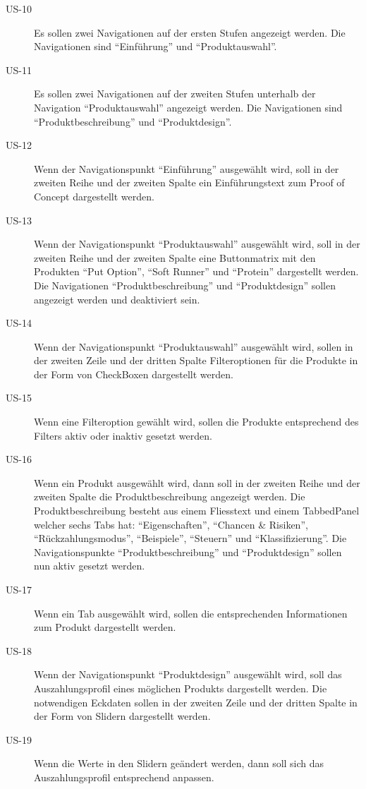 \begin{description}
\item[US-10\label{itm:US-10}]
Es sollen zwei Navigationen auf der ersten Stufen angezeigt werden. Die
Navigationen sind ``Einführung'' und ``Produktauswahl''.

\item[US-11\label{itm:US-11}]
Es sollen zwei Navigationen auf der zweiten Stufen unterhalb der Navigation
``Produktauswahl'' angezeigt werden. Die Navigationen sind
``Produktbeschreibung'' und ``Produktdesign''.

\item[US-12\label{itm:US-12}]
Wenn der Navigationspunkt ``Einführung'' ausgewählt wird, soll in der zweiten
Reihe und der zweiten Spalte ein Einführungstext zum Proof of Concept
dargestellt werden.

\item[US-13\label{itm:US-13}]
Wenn der Navigationspunkt ``Produktauswahl'' ausgewählt wird, soll in der
zweiten Reihe und der zweiten Spalte eine Buttonmatrix mit den Produkten
``Put Option'', ``Soft Runner'' und ``Protein'' dargestellt werden. Die
Navigationen ``Produktbeschreibung'' und ``Produktdesign'' sollen angezeigt
werden und deaktiviert sein.

\item[US-14\label{itm:US-14}]
Wenn der Navigationspunkt ``Produktauswahl'' ausgewählt wird, sollen in der
zweiten Zeile und der dritten Spalte Filteroptionen für die Produkte in der Form
von CheckBoxen dargestellt werden.

\item[US-15\label{itm:US-15}]
Wenn eine Filteroption gewählt wird, sollen die Produkte entsprechend des
Filters aktiv oder inaktiv gesetzt werden.

\item[US-16\label{itm:US-16}]
Wenn ein Produkt ausgewählt wird, dann soll in der zweiten Reihe und der zweiten
Spalte die Produktbeschreibung angezeigt werden. Die Produktbeschreibung
besteht aus einem Fliesstext und einem TabbedPanel welcher sechs Tabs hat:
``Eigenschaften'', ``Chancen \& Risiken'', ``Rückzahlungsmodus'',
``Beispiele'', ``Steuern'' und ``Klassifizierung''. Die Navigationspunkte
``Produktbeschreibung'' und ``Produktdesign'' sollen nun aktiv gesetzt werden.

\item[US-17\label{itm:US-17}]
Wenn ein Tab ausgewählt wird, sollen die entsprechenden Informationen zum
Produkt dargestellt werden.

\item[US-18\label{itm:US-18}]
Wenn der Navigationspunkt ``Produktdesign'' ausgewählt wird, soll das
Auszahlungsprofil eines möglichen Produkts dargestellt werden. Die notwendigen
Eckdaten sollen in der zweiten Zeile und der dritten Spalte in der Form von
Slidern dargestellt werden.

\item[US-19\label{itm:US-19}]
Wenn die Werte in den Slidern geändert werden, dann soll sich das
Auszahlungsprofil entsprechend anpassen.
\end{description}

